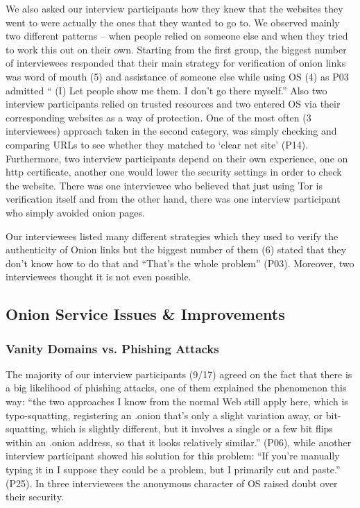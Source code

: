 We also asked our interview participants how they knew that the websites they went to were actually the ones that they wanted to go to.  We observed mainly two different patterns – when people relied on someone else and when they tried to work this out on their own. Starting from the first group, the biggest number of interviewees responded that their main strategy for verification of onion links was word of mouth (5) and assistance of someone else while using OS (4) as P03 admitted “ (I) Let people show me them. I don't go there myself.” Also two interview participants relied on trusted resources and two entered OS via their corresponding websites as a way of protection. One of the most often (3 interviewees) approach taken in the second category, was simply checking and comparing URLs to see whether they matched to ‘clear net site’ (P14). Furthermore, two interview participants depend on their own experience, one on http certificate, another one would lower the security settings in order to check the website. There was one interviewee who believed that just using Tor is verification itself and from the other hand, there was one interview participant who simply avoided onion pages.

Our interviewees listed many different strategies which they used to verify the authenticity of Onion links but the biggest number of them (6) stated that they don’t know how to do that and “That’s the whole problem” (P03). Moreover, two interviewees thought it is not even possible.


\subsection{Onion Service Issues \& Improvements}
\label{sec:improve}

\subsubsection{Vanity Domains vs. Phishing Attacks}

The majority of our interview participants (9/17) agreed on the fact that there is a big likelihood of phishing attacks, one of them explained the phenomenon this way: ``the two approaches I know from the normal Web still apply here, which is typo-squatting, registering an .onion that's only a slight variation away, or bit-squatting, which is slightly different, but it involves a single or a few bit flips within an .onion address, so that it looks relatively similar.'' (P06), while another interview participant showed his solution for this problem: ``If you're manually typing it in I suppose they could be a problem, but I primarily cut and paste.'' (P25). In three interviewees the anonymous character of OS raised doubt over their security.

